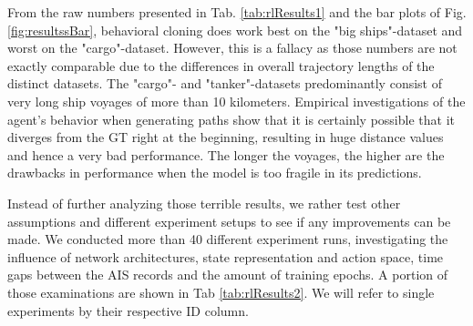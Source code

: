 From the raw numbers presented in Tab. \ref{tab:rlResults1} and the bar plots of Fig. \ref{fig:resultssBar}, behavioral cloning does work best on the "big ships"-dataset and worst on the "cargo"-dataset. However, this is a fallacy as those numbers are not exactly comparable due to the differences in overall trajectory lengths of the distinct datasets. The "cargo"- and "tanker"-datasets predominantly consist of very long ship voyages of more than 10 kilometers. Empirical investigations of the agent's behavior when generating paths show that it is certainly possible that it diverges from the GT right at the beginning, resulting in huge distance values and hence a very bad performance. The longer the voyages, the higher are the drawbacks in performance when the model is too fragile in its predictions.
\par
Instead of further analyzing those terrible results, we rather test other assumptions and different experiment setups to see if any improvements can be made. We conducted more than 40 different experiment runs, investigating the influence of network architectures, state representation and action space, time gaps between the AIS records and the amount of training epochs. A portion of those examinations are shown in Tab \ref{tab:rlResults2}. We will refer to single experiments by their respective ID column.
